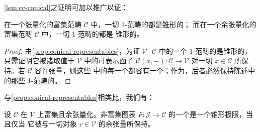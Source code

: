 \cref{lem:cc-conical}之证明可加以推广以证：

\begin{proposition}\label{prop:tensors-cotensors-conical}
在一个张量化的富集范畴 $\mathcal{C}$ 中，一切 1-范畴的\trLimit{}都是锥形的；
而在一个余张量化的富集范畴 $\mathcal{C}$ 中，一切 1-范畴的\trColimit{}都是
锥形的。
\end{proposition}

\begin{proof}
由\cref{prop:conical-representables}，为证 $\mathcal{V}$-\trCategory{}
$\mathcal{C}$ 中的一个 1-范畴的\trLimit{}是锥形的，只需证明它被诸取值于
$\mathcal{V}$ 中的可表示函子 $\mathcal{C}(x,-)\colon\mathcal{C}\to\mathcal{V}$
对一切 $x\in\mathcal{C}$ 所保持。若 $\mathcal{C}$ 容许张量，则这些\trFunctor{}%
中的每一个都容有一个\trLeftAdjoint；作为\trRightAdjoint，后者必然保持陈述中
的那些 1-范畴的\trLimit。
\end{proof}

与\cref{prop:conical-representables}相类比，我们有：

\begin{proposition}\label{prop:cotensor-preservation}
设 $\mathcal{C}$ 在 $\mathcal{V}$ 上富集且余张量化。非富集图表
$F\colon\mathcal{J}\to\mathcal{C}$ 的一个\trLimit{}是一个锥形极限，当且仅当
它被与一切对象 $v\in\mathcal{V}$ 的余张量所保持。
\end{proposition}

